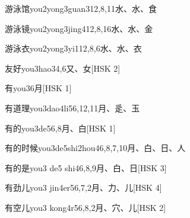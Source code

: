 \begin{entry}{游泳馆}{you2yong3guan3}{12,8,11}{⽔、⽔、⾷}
\end{entry}

\begin{entry}{游泳镜}{you2yong3jing4}{12,8,16}{⽔、⽔、⾦}
\end{entry}

\begin{entry}{游泳衣}{you2yong3yi1}{12,8,6}{⽔、⽔、⾐}
\end{entry}

\begin{entry}{友好}{you3hao3}{4,6}{⼜、⼥}[HSK 2]
\end{entry}

\begin{entry}{有}{you3}{6}{⽉}[HSK 1]
\end{entry}

\begin{entry}{有道理}{you3dao4li5}{6,12,11}{⽉、⾡、⽟}
\end{entry}

\begin{entry}{有的}{you3de5}{6,8}{⽉、⽩}[HSK 1]
\end{entry}

\begin{entry}{有的时候}{you3de5shi2hou4}{6,8,7,10}{⽉、⽩、⽇、⼈}
\end{entry}

\begin{entry}{有的是}{you3 de5 shi4}{6,8,9}{⽉、⽩、⽇}[HSK 3]
\end{entry}

\begin{entry}{有劲儿}{you3 jin4er5}{6,7,2}{⽉、⼒、⼉}[HSK 4]
\end{entry}

\begin{entry}{有空儿}{you3 kong4r5}{6,8,2}{⽉、⽳、⼉}[HSK 2]
\end{entry}

